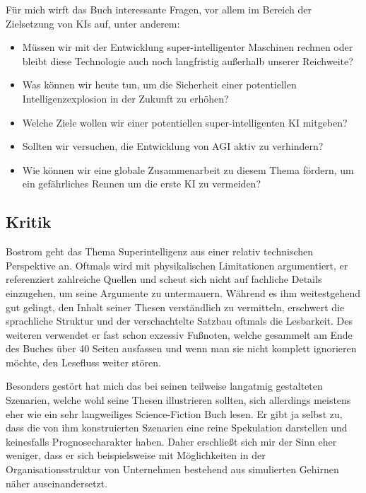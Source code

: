 \documentclass[twoside, a4paper, DIV=11, open=any, bibliography=totoc]{scrbook}
\begin{document}
Für mich wirft das Buch interessante Fragen, vor allem im Bereich der Zielsetzung von KIs auf,
unter anderem:

\begin{itemize}
  \item Müssen wir mit der Entwicklung super-intelligenter Maschinen rechnen oder
  bleibt diese Technologie auch noch langfristig außerhalb unserer Reichweite?
  \item Was können wir heute tun, um die Sicherheit einer potentiellen Intelligenzexplosion
  in der Zukunft zu erhöhen?
  \item Welche Ziele wollen wir einer potentiellen super-intelligenten KI mitgeben?
  \item Sollten wir versuchen, die Entwicklung von AGI aktiv zu verhindern?
  \item Wie können wir eine globale Zusammenarbeit zu diesem Thema fördern,
  um ein gefährliches Rennen um die erste KI zu vermeiden?
\end{itemize}

\subsection{Kritik} \label{sec:litkritik}

Bostrom geht das Thema Superintelligenz aus einer relativ technischen Perspektive
an. Oftmals wird mit physikalischen Limitationen argumentiert, er referenziert
zahlreiche Quellen und scheut sich nicht auf fachliche Details einzugehen, um seine
Argumente zu untermauern. Während es ihm weitestgehend gut gelingt, den Inhalt seiner
Thesen verständlich zu vermitteln, erschwert die sprachliche Struktur und der
verschachtelte Satzbau oftmals die Lesbarkeit. Des weiteren verwendet er fast schon
exzessiv Fußnoten, welche gesammelt am Ende des Buches über 40 Seiten ausfassen und
wenn man sie nicht komplett ignorieren möchte, den Lesefluss weiter stören.

Besonders gestört hat mich das bei seinen teilweise
langatmig gestalteten Szenarien, welche wohl seine Thesen illustrieren sollten,
sich allerdings meistens eher wie ein sehr langweiliges Science-Fiction Buch lesen.
Er gibt ja selbst zu, dass die von ihm konstruierten Szenarien eine reine Spekulation
darstellen und keinesfalls Prognosecharakter haben. Daher erschließt sich mir
der Sinn eher weniger, dass er sich beispielsweise mit Möglichkeiten in der
Organisationsstruktur von Unternehmen bestehend aus simulierten Gehirnen näher auseinandersetzt.
\end{document}
